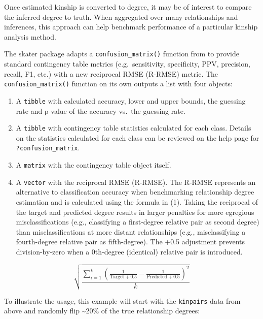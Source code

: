 \documentclass[9pt,a4paper,]{extarticle}
\begin{document}
Once estimated kinship is converted to degree, it may be of interest to compare the inferred degree to truth. When aggregated over many relationships and inferences, this approach can help benchmark performance of a particular kinship analysis method.

The skater package adapts a \texttt{confusion\_matrix()} function from \citet{clark2021} to provide standard contingency table metrics (e.g.~sensitivity, specificity, PPV, precision, recall, F1, etc.) with a new reciprocal RMSE (R-RMSE) metric. The \texttt{confusion\_matrix()} function on its own outputs a list with four objects:

\begin{enumerate}
\def\labelenumi{\arabic{enumi}.}
\item
  A \texttt{tibble} with calculated accuracy, lower and upper bounds, the guessing rate and p-value of the accuracy vs.~the guessing rate.
\item
  A \texttt{tibble} with contingency table statistics calculated for each class. Details on the statistics calculated for each class can be reviewed on the help page for \texttt{?confusion\_matrix}.
\item
  A \texttt{matrix} with the contingency table object itself.
\item
  A \texttt{vector} with the reciprocal RMSE (R-RMSE). The R-RMSE represents an alternative to classification accuracy when benchmarking relationship degree estimation and is calculated using the formula in (1). Taking the reciprocal of the target and predicted degree results in larger penalties for more egregious misclassifications (e.g., classifying a first-degree relative pair as second degree) than misclassifications at more distant relationships (e.g., misclassifying a fourth-degree relative pair as fifth-degree). The +0.5 adjustment prevents division-by-zero when a 0th-degree (identical) relative pair is introduced.
\end{enumerate}

\begin{equation}
\sqrt{\frac{\sum_{i=1}^{k}(\frac{1}{\text{Target}+0.5}-\frac{1}{\text{Predicted}+0.5})^2}{k}}
\end{equation}

To illustrate the usage, this example will start with the \texttt{kinpairs} data from above and randomly flip \textasciitilde20\% of the true relationship degrees:
\end{document}
